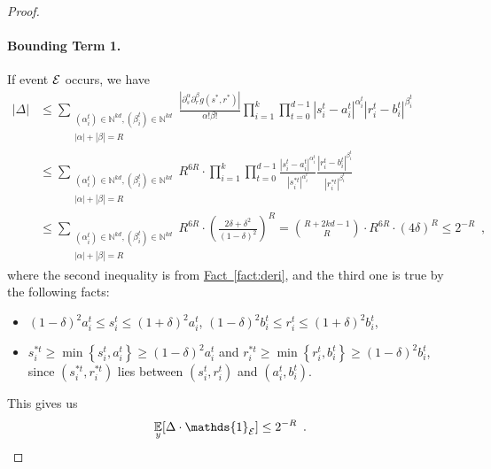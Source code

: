 \documentclass[12pt]{article}
\newcommand{\fct}[1]{\hyperref[fact:#1]{Fact~\ref*{fact:#1}}}
\newcommand{\br}[1]{\left(#1\right)} \newcommand{\Br}[1]{\left[#1\right]} \newcommand{\st}[1]{\left\{#1\right\}} \newcommand{\tr}[1]{\mathrm{Tr}\!\Br{#1}} \newcommand{\abs}[1]{\left|#1 \right|} \newcommand{\norm}[1]{\left\lVert #1 \right\rVert} \newcommand{\agl}[2]{\theta^{\br{#1}}_{#2}} \newcommand{\aglp}[2]{{\theta'}^{\br{#1}}_{#2}} \newcommand{\lint}[1]{\left\lfloor#1\right\rfloor} \newcommand{\poly}[1]{\mathrm{poly}\!\br{#1}} \newcommand{\negl}[1]{\mathrm{negl}\!\br{#1}} \newcommand{\de}[1]{\mathrm{d}#1} \newcommand{\val}[1]{\mathrm{val}\!\br{#1}} \newcommand{\vall}[1]{\mathrm{val}\br{#1}} \newcommand{\nd}[1]{\mathcal{N}\!\br{#1}} \newcommand{\ketbratwo}[2]{\ket{#1} \hspace{-0.4em}\bra{#2}} \newcommand{\ketbra}[1]{\ketbratwo{#1}{#1}} \newcommand{\id}{\ensuremath{\mathds{1}}} \newcommand{\ogroup}[1]{\mathrm{O}\!\br{#1}} \newcommand{\ugroup}[1]{\mathrm{U}\!\br{#1}} \newcommand{\td}{\mathrm{TD}} \newcommand{\tv}[1]{\norm{#1}_{\mathrm{TV}}} \newcommand {\defeq} {\ensuremath{ \stackrel{\mathrm{def}}{=} }} \newcommand{\vdim}{\ensuremath{N}} \newcommand{\dimin}{\ensuremath{n}} \newcommand{\dimout}{\ensuremath{m}} \newcommand{\ncopy}{\ell} \newcommand{\hspacein}{\H_\mathrm{in}} \newcommand{\hspaceout}{\H_\mathrm{out}} \newcommand{\Sin}{\S(\hspacein)} \newcommand{\Sout}{\S(\hspaceout)} \newcommand{\haar}{\ensuremath{\mu}} \newcommand{\tensorhaar}{\ensuremath{\eta}} \newcommand{\tensorsrss}{\ensuremath{\nu}} \newcommand{\qadvice}{\ensuremath{\rho}} \newcommand{\tp}{\otimes} \newcommand{\wone}[2]{W_1\!\br{#1,#2}}
\begin{document}
\begin{proof}
	\paragraph{Bounding Term 1.}
	If event $\mathcal{E}$ occurs,
	we have
	\begin{align} \label{eq:bound_E}
		\abs{\Delta} &\leq \sum_{\substack{ \br{\alpha^{t}_i}\in\mathbb{N}^{kd}, \br{\beta^{t}_i}\in\mathbb{N}^{kd}
		\\ \abs{\alpha} +\abs{\beta} =R }}
		\frac{ \abs{\partial^\alpha_s\partial^\beta_r g(s^*,r^*)} }{\alpha!\beta!}
		\prod_{i=1}^{k} \prod_{t=0}^{d-1} \abs{s_i^t-a_i^t}^{\alpha_i^t} \abs{r_i^t-b_i^t}^{\beta_i^t} \nonumber\\
		&\leq \sum_{\substack{ \br{\alpha^{t}_i}\in\mathbb{N}^{kd}, \br{\beta^{t}_i}\in\mathbb{N}^{kd}
		\\ \abs{\alpha} +\abs{\beta} =R }} { R^{6R} }\cdot 
		\prod_{i=1}^{k} \prod_{t=0}^{d-1} \frac{\abs{s_i^t-a_i^t}^{\alpha_i^t}}{\abs{s^{*t}_i}^{\alpha_i^t}} \frac{\abs{r_i^t-b_i^t}^{\beta_i^t}}{\abs{r^{*t}_i}^{\beta_i^t}} \nonumber\\
		&\leq \sum_{\substack{ \br{\alpha^{t}_i}\in\mathbb{N}^{kd}, \br{\beta^{t}_i}\in\mathbb{N}^{kd}
		\\ \abs{\alpha} +\abs{\beta} =R }} { R^{6R} }\cdot \br{\frac{2\delta + \delta^2}{(1-\delta)^2}}^{R}
		= \binom{R+2kd-1}{R}\cdot { R^{6R} }\cdot \br{4\delta}^{R} \leq 2^{-R}\enspace,\nonumber 
	\end{align}
where the second inequality is from \fct{deri}, 
and the third one is true by the following facts:
\begin{itemize}
	\item $(1-\delta)^2 a^t_i \leq s_i^t\leq (1+\delta)^2 a^t_i$, $(1-\delta)^2 b^t_i \leq r_i^t \leq (1+\delta)^2 b^t_i$,
	\item ${s^{*t}_i}\geq \min\st{s^{t}_i, a^{t}_i}\geq (1-\delta)^2a^{t}_i$ and ${r^{*t}_i}\geq \min\st{r^{t}_i, b^{t}_i}\geq (1-\delta)^2b^{t}_i$, since $(s^{*t}_i, r^{*t}_i)$ lies between $(s^{t}_i,r^{t}_i)$ and $(a^{t}_i,b^{t}_i)$.
\end{itemize}
	This gives us
	\[
		\expect{y}{\Delta \cdot \id_\EE}\leq 2^{-R}\enspace.
	\]
	

\end{proof}
\end{document}

